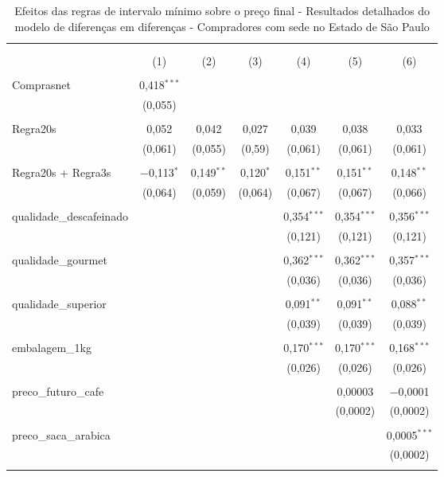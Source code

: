 \setlength{\tabcolsep}{3pt}
\begin{table}[!htbp]
\centering
\begin{threeparttable}
\centering 
  \caption{Efeitos das regras de intervalo mínimo sobre o preço final - Resultados detalhados do modelo de diferenças em diferenças - Compradores com sede no Estado de São Paulo} 
  \label{dd_results_win_bid_sp} 
\begin{tabular}{lcccccc} 
\\[-1.8ex]\hline 
\hline \\[-1.8ex] 
\\[-1.8ex] & (1) & (2) & (3) & (4) & (5) & (6)\\ 
\hline \\[-1.8ex] 

 Comprasnet & 0,418$^{***}$ &  &  &  &  & \\ 
  & (0,055) &  &  &  &  &  \\ 
  & & & & & & \\ 

 Regra20s & 0,052 & 0,042 & 0,027 & 0,039 & 0,038 & 0,033 \\ 
  & (0,061) & (0,055) & (0,59) & (0,061) & (0,061) & (0,061) \\ 
  & & & & & & \\ 
 Regra20s + Regra3s & $-$0,113$^{*}$ & 0,149$^{**}$ & 0,120$^{*}$ & 0,151$^{**}$ & 0,151$^{**}$ & 0,148$^{**}$ \\ 
  & (0,064) & (0,059) & (0,064) & (0,067) & (0,067) & (0,066) \\ 
  & & & & & & \\ 
 
 qualidade\_descafeinado &  &  &  & 0,354$^{***}$ & 0,354$^{***}$ & 0,356$^{***}$ \\ 
  &  &  &  & (0,121) & (0,121) & (0,121) \\ 
  & & & & & & \\ 
 qualidade\_gourmet &  &  &  & 0,362$^{***}$ & 0,362$^{***}$ & 0,357$^{***}$ \\ 
  &  &  &  & (0,036) & (0,036) & (0,036) \\ 
  & & & & & & \\ 
 qualidade\_superior &  &  &  & 0,091$^{**}$ & 0,091$^{**}$ & 0,088$^{**}$ \\ 
  &  &  &  & (0,039) & (0,039) & (0,039) \\ 
  & & & & & & \\ 
embalagem\_1kg &  &  &  & 0,170$^{***}$ & 0,170$^{***}$ & 0,168$^{***}$ \\ 
  &  &  &  & (0,026) & (0,026) & (0,026) \\ 
  & & & & & & \\ 
preco\_futuro\_cafe &  &  &  &  & 0,00003 & $-$0,0001 \\ 
  &  &  &  &  & (0,0002) & (0,0002) \\ 
  & & & & & & \\ 
preco\_saca\_arabica &  &  &  & &  & 0,0005$^{***}$ \\ 
  &  &  &  & &  & (0,0002) \\ 
  & & & & & & \\ 


\end{tabular}
\end{threeparttable}
\end{table}
